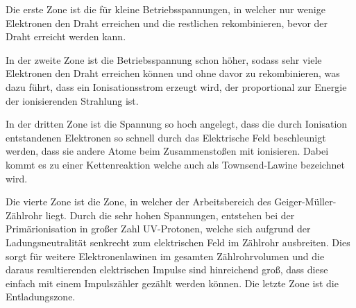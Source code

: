 \begin{flushleft}
    Die erste Zone ist die für kleine Betriebsspannungen, in welcher nur wenige Elektronen den Draht erreichen und die restlichen rekombinieren, bevor der Draht erreicht werden kann.
\end{flushleft}

\begin{flushleft}
    In der zweite Zone ist die Betriebsspannung schon höher, sodass sehr viele Elektronen den Draht erreichen können und ohne davor zu rekombinieren, was dazu führt, dass ein Ionisationsstrom erzeugt wird, der proportional zur Energie der ionisierenden Strahlung ist. 
\end{flushleft}

\begin{flushleft}
    In der dritten Zone ist die Spannung so hoch angelegt, dass die durch Ionisation entstandenen Elektronen so schnell durch das Elektrische Feld beschleunigt werden, dass sie andere Atome beim Zusammenstoßen mit ionisieren.
    Dabei kommt es zu einer Kettenreaktion welche auch als Townsend-Lawine bezeichnet wird.
\end{flushleft}

\begin{flushleft}
    Die vierte Zone ist die Zone, in welcher der Arbeitsbereich des Geiger-Müller-Zählrohr liegt.
    Durch die sehr hohen Spannungen, entstehen bei der Primärionisation in großer Zahl UV-Protonen, welche sich aufgrund der Ladungsneutralität senkrecht zum elektrischen Feld im Zählrohr ausbreiten.
    Dies sorgt für weitere Elektronenlawinen im gesamten Zählrohrvolumen und die daraus resultierenden elektrischen Impulse sind hinreichend groß, dass diese einfach mit einem Impulszähler gezählt werden können.
    Die letzte Zone ist die Entladungszone.
\end{flushleft}

